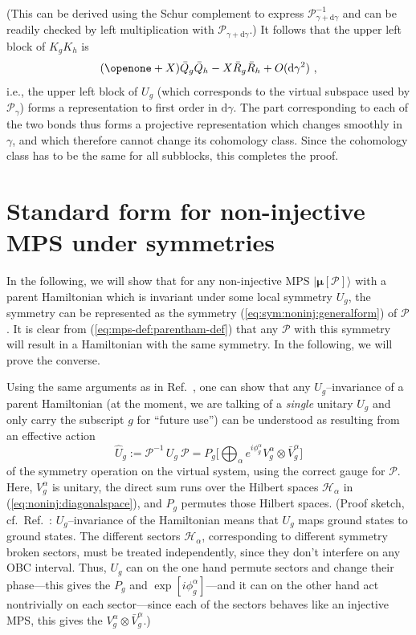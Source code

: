 \documentclass[twocolumn,superscriptaddress,prb,linenumbers]{revtex4-1}
\newcommand{\MPS}[1]{| {\bm\mu}[#1]\rangle}
\newcommand{\mc}[1]{\mathcal{#1}}
\newcommand{\dd}{\mathrm{d}}
\begin{document}
(This can be derived using the Schur complement to express $\mc
    P^{-1}_{\gamma+\dd\gamma}$ and can be readily checked by left
multiplication with $\mc P_{\gamma+\dd\gamma}$.) It follows that the upper
left block of $K_gK_h$ is
\[
    (\openone+X)\bar Q_g\bar Q_h - X\bar R_g\bar R_h + O(\dd\gamma^2)\ ,
\]
i.e., the upper left block of $U_g$ (which corresponds to the
virtual subspace used by $\mc P_\gamma$) forms a representation to first
order in $\dd\gamma$. The part corresponding to each of the two bonds thus
forms a projective representation which changes smoothly in $\gamma$, and
which therefore cannot change its cohomology class.  Since the cohomology
class has to be the same for all subblocks, this completes the proof.












\section{Standard form for non-injective MPS under symmetries
  \label{app:stdform-noninj-sym}}

In the following, we will show that for any non-injective MPS $\MPS{\mc
        P}$ with a parent Hamiltonian which is invariant under some local symmetry
$U_g$, the symmetry can be represented as the symmetry
(\ref{eq:sym:noninj:generalform}) of $\mc P$.
It is clear from (\ref{eq:mps-def:parentham-def}) that any $\mc P$ with
this symmetry will result in a Hamiltonian with the same symmetry. In the
following, we will prove the converse.


Using the same arguments as in Ref.~, one can
show that any $U_g$--invariance of a parent Hamiltonian (at the moment,
we are talking of
a \emph{single} unitary $U_g$ and only carry the subscript $g$ for
``future use'') can be understood
as resulting from an effective action
\begin{equation}
    \label{eq:sym:noninj:2223}
    \hat U_g:=
    \mc P^{-1}\, U_g\:\mc P = P_g\bigg[\bigoplus_{\alpha} e^{i\phi^\alpha_g}
        V_g^\alpha\otimes \bar V_g^\alpha\bigg]
\end{equation}
of the symmetry operation on the virtual system, using the correct gauge for
$\mc P$. Here, $V_g^\alpha$ is unitary, the direct sum runs over the
Hilbert spaces $\mc H_\alpha$ in (\ref{eq:noninj:diagonalspace}), and
$P_g$ permutes those Hilbert spaces.
(Proof sketch, cf.~Ref.~: $U_g$--invariance of
the Hamiltonian means that $U_g$ maps ground states to ground states. The
different sectors $\mc H_\alpha$,
corresponding to different symmetry broken sectors, must be treated
independently, since they don't interfere on any OBC interval. Thus, $U_g$
can on the one hand permute sectors and change their phase---this gives
the $P_g$ and $\exp[i\phi^\alpha_g]$---and it can on the other hand act
nontrivially on each sector---since each of the sectors behaves like an
injective MPS, this gives the $V^\alpha_g\otimes \bar V_g^\alpha$.)
\end{document}
